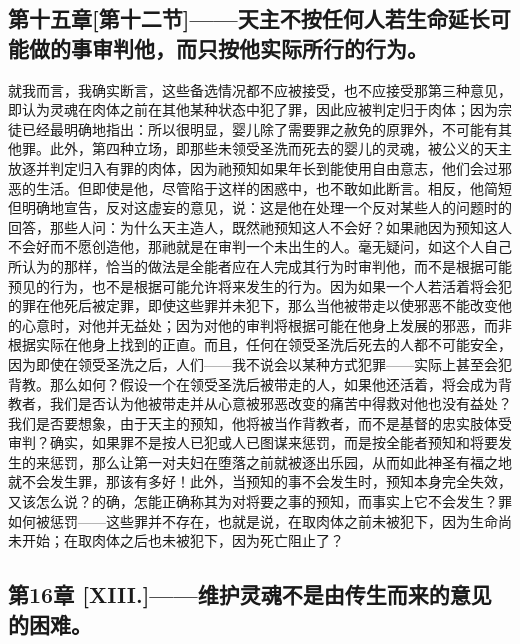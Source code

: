 
\subsection{第十五章[第十二节]——天主不按任何人若生命延长可能做的事审判他，而只按他实际所行的行为。}

就我而言，我确实断言，这些备选情况都不应被接受，也不应接受那第三种意见，即认为灵魂在肉体之前在其他某种状态中犯了罪，因此应被判定归于肉体；因为宗徒已经最明确地指出：所以很明显，婴儿除了需要罪之赦免的原罪外，不可能有其他罪。此外，第四种立场，即那些未领受圣洗而死去的婴儿的灵魂，被公义的天主放逐并判定归入有罪的肉体，因为祂预知如果年长到能使用自由意志，他们会过邪恶的生活。但即使是他，尽管陷于这样的困惑中，也不敢如此断言。相反，他简短但明确地宣告，反对这虚妄的意见，说：这是他在处理一个反对某些人的问题时的回答，那些人问：为什么天主造人，既然祂预知这人不会好？如果祂因为预知这人不会好而不愿创造他，那祂就是在审判一个未出生的人。毫无疑问，如这个人自己所认为的那样，恰当的做法是全能者应在人完成其行为时审判他，而不是根据可能预见的行为，也不是根据可能允许将来发生的行为。因为如果一个人若活着将会犯的罪在他死后被定罪，即使这些罪并未犯下，那么当他被带走以使邪恶不能改变他的心意时，对他并无益处；因为对他的审判将根据可能在他身上发展的邪恶，而非根据实际在他身上找到的正直。而且，任何在领受圣洗后死去的人都不可能安全，因为即使在领受圣洗之后，人们——我不说会以某种方式犯罪——实际上甚至会犯背教。那么如何？假设一个在领受圣洗后被带走的人，如果他还活着，将会成为背教者，我们是否认为他被带走并从心意被邪恶改变的痛苦中得救对他也没有益处？我们是否要想象，由于天主的预知，他将被当作背教者，而不是基督的忠实肢体受审判？确实，如果罪不是按人已犯或人已图谋来惩罚，而是按全能者预知和将要发生的来惩罚，那么让第一对夫妇在堕落之前就被逐出乐园，从而如此神圣有福之地就不会发生罪，那该有多好！此外，当预知的事不会发生时，预知本身完全失效，又该怎么说？的确，怎能正确称其为对将要之事的预知，而事实上它不会发生？罪如何被惩罚——这些罪并不存在，也就是说，在取肉体之前未被犯下，因为生命尚未开始；在取肉体之后也未被犯下，因为死亡阻止了？\par


\subsection{第16章 [XIII.]——维护灵魂不是由传生而来的意见的困难。}

